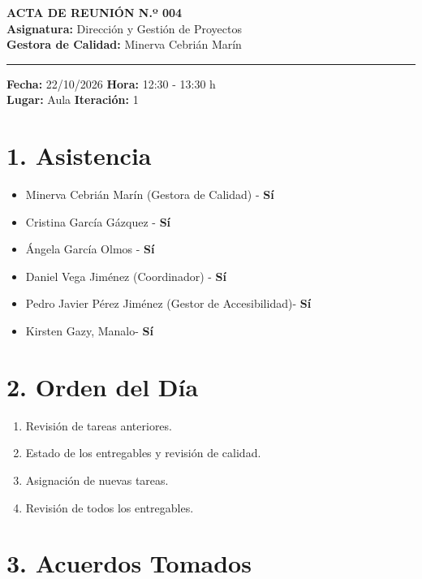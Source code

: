 
\begin{center}
    {\Large \textbf{ACTA DE REUNIÓN N.º 004}}\\[0.2cm]
    \textbf{Asignatura:} Dirección y Gestión de Proyectos\\
    \textbf{Gestora de Calidad:} Minerva Cebrián Marín
\end{center}

\vspace{0.3cm}
\hrule
\vspace{0.4cm}

\noindent \textbf{Fecha:} 22/10/2026 \hfill \textbf{Hora:} 12:30 - 13:30 h\\
\noindent \textbf{Lugar:} Aula  \hfill \textbf{Iteración:} 1

\vspace{0.4cm}

\section*{1. Asistencia}
\begin{itemize}
    \item Minerva Cebrián Marín (Gestora de Calidad) - \textbf{Sí}
    \item Cristina García Gázquez  - \textbf{Sí}
    \item Ángela García Olmos  - \textbf{Sí}
    \item Daniel Vega Jiménez (Coordinador) - \textbf{Sí}
    \item Pedro Javier Pérez Jiménez (Gestor de Accesibilidad)- \textbf{Sí}
    \item Kirsten Gazy, Manalo- \textbf{Sí}

\end{itemize}



\section*{2. Orden del Día}
\begin{enumerate}
    \item Revisión de tareas anteriores.
    \item Estado de los entregables y revisión de calidad.
    \item Asignación de nuevas tareas.
    \item Revisión de todos los entregables.
\end{enumerate}


\section*{3. Acuerdos Tomados}

